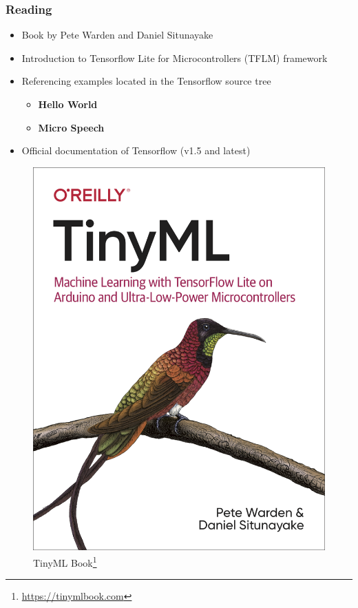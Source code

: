 \documentclass{tum-presentation}
\begin{document}
\begin{frame}
  \frametitle{Reading}
  
  \begin{multicols}{2}

\begin{itemize}
    \item Book by Pete Warden and Daniel Situnayake
    \item Introduction to Tensorflow Lite for Microcontrollers (TFLM) framework
    \item Referencing examples located in the Tensorflow source tree
    \begin{itemize}
        \item \textbf{Hello World}
        \item \textbf{Micro Speech}
    \end{itemize}
    \item Official documentation of Tensorflow (v1.5 and latest)
\end{itemize}

    \begin{figure}[h]
\centering
\includegraphics[width=.2\textwidth]{figures/tinyml_cover2.png}
\caption{TinyML Book\footnote{\url{https://tinymlbook.com}}}
\label{fig:schedule}
\end{figure}

\end{multicols}

\end{frame}
\end{document}
